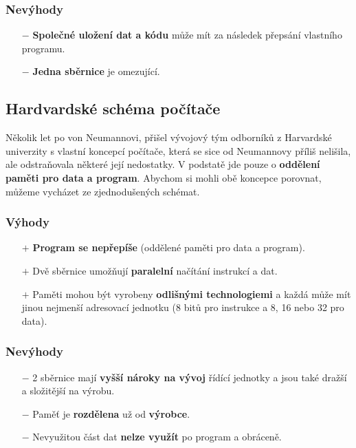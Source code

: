 \subsubsection*{Nevýhody}
\begin{itemize}
	\item[$-$] \textbf{Společné uložení dat a kódu} může mít za následek přepsání vlastního programu.
	
	\item[$-$] \textbf{Jedna sběrnice} je omezující.
\end{itemize}

\subsection{Hardvardské schéma počítače}
Několik let po von Neumannovi, přišel vývojový tým odborníků z Harvardské univerzity s vlastní koncepcí počítače, která se sice od Neumannovy příliš nelišila, ale odstraňovala některé její nedostatky. V podstatě jde pouze o \textbf{oddělení paměti pro data a program}. Abychom si mohli obě koncepce porovnat, můžeme vycházet ze zjednodušených schémat.
\newline

\noindent{}

\subsubsection*{Výhody}
\begin{itemize}
	\item[$+$]\textbf{Program se nepřepíše} (oddělené paměti pro data a program).
	\item[$+$]Dvě sběrnice umožňují \textbf{paralelní} načítání instrukcí a dat.
	\item[$+$]Paměti mohou být vyrobeny \textbf{odlišnými technologiemi }a každá může mít jinou nejmenší adresovací jednotku (8 bitů pro instrukce a 8, 16 nebo 32 pro data).
\end{itemize}


\subsubsection*{Nevýhody}
\begin{itemize}
\item[$-$]2 sběrnice mají \textbf{vyšší nároky na vývoj} řídící jednotky a jsou také dražší a složitější na výrobu.
\item[$-$]Paměť je \textbf{rozdělena} už od \textbf{výrobce}.
\item[$-$]Nevyužitou část dat \textbf{nelze využít }po program a obráceně.
\end{itemize}

